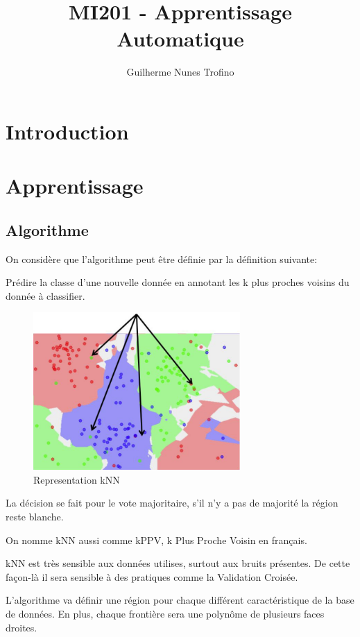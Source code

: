 \documentclass{article}
\title{MI201 - Apprentissage Automatique}
\author{Guilherme Nunes Trofino}
\begin{document}
\maketitle
\setlength{\parindent}{0pt}

\newpage\tableofcontents

\section{Introduction}

% 
% 

\section{Apprentissage}
\subsection{Algorithme}
On considère que l'algorithme peut être définie par la définition suivante:
\begin{definition}
    Prédire la classe d'une nouvelle donnée en annotant les k plus proches voisins du donnée à classifier.
    \begin{figure}[H]
        \centering
        \includegraphics[height=60mm]{images/kNN_diagram.png}
        \caption{Representation kNN}
    \end{figure}
    La décision se fait pour le vote majoritaire, s'il n'y a pas de majorité la région reste blanche. 
\end{definition}
\begin{remark}
    On nomme kNN aussi comme kPPV, k Plus Proche Voisin en français.
\end{remark}
\begin{remark}
    kNN est très sensible aux données utilises, surtout aux bruits présentes. De cette façon-là il sera sensible à des pratiques comme la Validation Croisée.
\end{remark}
L'algorithme va définir une région pour chaque différent caractéristique de la base de données. En plus, chaque frontière sera une polynôme de plusieurs faces droites.\\
\end{document}
